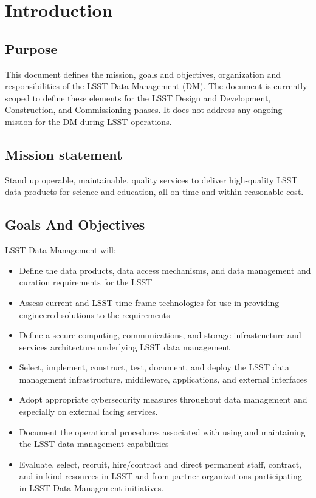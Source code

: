 \section{Introduction}
\subsection{Purpose}
This document defines the mission, goals and objectives, organization and responsibilities of the LSST Data Management (DM).  The document is currently scoped to define these elements for the LSST Design and Development, Construction, and Commissioning phases.  It does not address any ongoing mission for the DM during LSST operations.

\subsection{Mission statement}
Stand up operable, maintainable, quality services to deliver high-quality LSST data products for science and education, all on time and within reasonable cost.

\subsection{Goals And Objectives}
LSST Data Management will:
\begin{itemize}
\item Define the data products, data access mechanisms, and data management and curation requirements for the LSST
\item Assess current and LSST-time frame technologies for use in providing engineered solutions to the requirements
\item Define a secure computing, communications, and storage infrastructure and services architecture underlying LSST data management
\item Select, implement, construct, test, document, and deploy the LSST data management infrastructure, middleware, applications, and external interfaces
\item Adopt appropriate cybersecurity measures throughout data management and especially on external facing services.
\item Document the operational procedures associated with using and maintaining the LSST data management capabilities
\item Evaluate, select, recruit, hire/contract and direct permanent staff, contract, and in-kind resources in LSST and from partner organizations participating in LSST Data Management initiatives.

\end{itemize}


